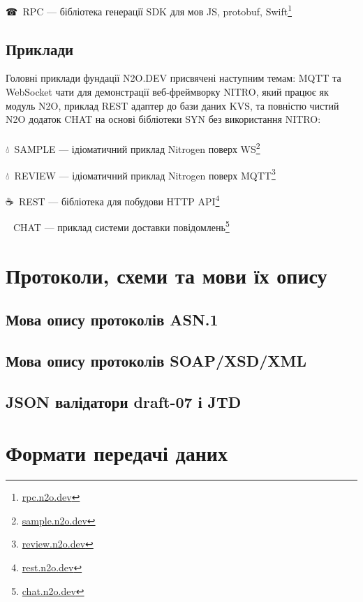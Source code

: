 \setmainfont{Segoe UI Emoji}☎\setmainfont{Times New Roman}\ RPC --- бібліотека генерації SDK для мов JS, protobuf, Swift\footnote{\url{rpc.n2o.dev}}

\subsection{Приклади}

Головні приклади фундації N2O.DEV присвячені наступним темам: MQTT та WebSocket
чати для демонстрації веб-фреймворку NITRO, який працює як модуль N2O, приклад
REST адаптер до бази даних KVS, та повністю чистий N2O додаток CHAT на основі
бібліотеки SYN без використання NITRO:\\
\\ \indent
\setmainfont{Segoe UI Emoji}💧\setmainfont{Times New Roman}\ SAMPLE --- ідіоматичний приклад Nitrogen поверх WS\footnote{\url{sample.n2o.dev}}

\setmainfont{Segoe UI Emoji}💧\setmainfont{Times New Roman}\ REVIEW --- ідіоматичний приклад Nitrogen поверх MQTT\footnote{\url{review.n2o.dev}}

\setmainfont{Segoe UI Emoji}☕\setmainfont{Times New Roman}\ REST --- бібліотека для побудови HTTP API\footnote{\url{rest.n2o.dev}}

\setmainfont{Segoe UI Emoji}💬\setmainfont{Times New Roman}\ CHAT --- приклад системи доставки повідомлень\footnote{\url{chat.n2o.dev}}

\newpage
\section{Протоколи, схеми та мови їх опису}

\subsection{Мова опису протоколів ASN.1}

\subsection{Мова опису протоколів SOAP/XSD/XML}

\subsection{JSON валідатори draft-07 і JTD}

\section{Формати передачі даних}

